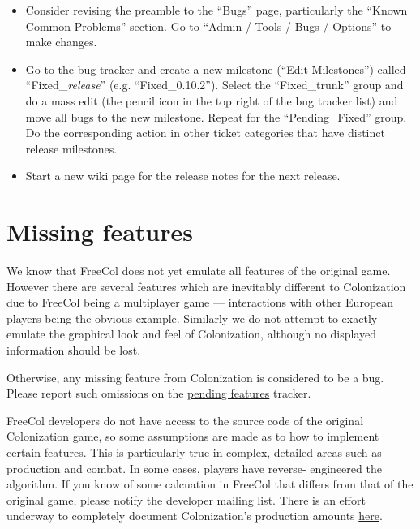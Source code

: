 \documentclass[12pt]{book}
\begin{document}
\begin{itemize}
\item Consider revising the preamble to the ``Bugs'' page,
  particularly the ``Known Common Problems'' section. Go to ``Admin /
  Tools / Bugs / Options'' to make changes.

\item Go to the bug tracker and create a new milestone (``Edit
  Milestones'') called ``Fixed\_\emph{release}''
  (e.g. ``Fixed\_0.10.2''). Select the ``Fixed\_trunk'' group and do
  a mass edit (the pencil icon in the top right of the bug tracker
  list) and move all bugs to the new milestone. Repeat for the
  ``Pending\_Fixed'' group. Do the corresponding action in other
  ticket categories that have distinct release milestones.

\item Start a new wiki page for the release notes for the next
  release.

\end{itemize}


\hypertarget{Missing features}{\chapter{Missing features}}

We know that FreeCol does not yet emulate all features of the original
game. However there are several features which are inevitably
different to Colonization due to FreeCol being a multiplayer game ---
interactions with other European players being the obvious example.
Similarly we do not attempt to exactly emulate the graphical look and
feel of Colonization, although no displayed information should be lost.

Otherwise, any missing feature from Colonization is considered to be a
bug. Please report such omissions on the
\href{https://sourceforge.net/p/freecol/pending-features-for-freecol/}{pending
  features} tracker.

FreeCol developers do not have access to the source code of the original
Colonization game, so some assumptions are made as to how to implement
certain features. This is particularly true in complex, detailed areas
such as production and combat. In some cases, players have reverse-
engineered the algorithm. If you know of some calcuation in FreeCol that
differs from that of the original game, please notify the developer mailing
list. There is an effort underway to completely document Colonization's
 production amounts
\href{https://sourceforge.net/p/freecol/wiki/WWC1D\%20-\%20resource\%20output\%20v2/}{here}.
\end{document}
